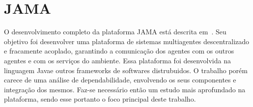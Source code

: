 \section{JAMA}

O desenvolvimento completo da plataforma JAMA está descrita em~\cite{parise11}. Seu objetivo foi desenvolver uma plataforma de sistemas multiagentes descentralizado
e fracamente acoplado, garantindo a comunicação dos agentes com os outros agentes e com os serviços do ambiente. Essa plataforma foi desenvolvida na linguagem Javae outros
frameworks de softwares distrubuidos. O trabalho porém carece de uma análise de dependabilidade, envolvendo os seus componentes e integração dos mesmos. Faz-se necessário
então um estudo mais aprofundado na plataforma, sendo esse portanto o foco principal deste trabalho.




